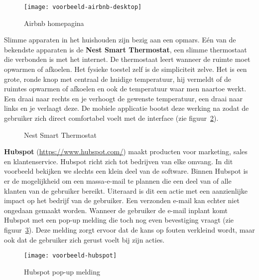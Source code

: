 \begin{figure}
    \centering
    \texttt{[image: voorbeeld-airbnb-desktop]}
    \caption[Voorbeeld Airbnb]{Airbnb homepagina}
    \label{fig:ux-voorbeeld-airbnb}
\end{figure}

Slimme apparaten in het huishouden zijn bezig aan een opmars. Eén van de bekendste apparaten is de \textbf{Nest Smart Thermostat}, een slimme thermostaat die verbonden is met het internet. De thermostaat leert wanneer de ruimte moet opwarmen of afkoelen. Het fysieke toestel zelf is de simpliciteit zelve. Het is een grote, ronde knop met centraal de huidige temperatuur, hij vermeldt of de ruimtes opwarmen of afkoelen en ook de temperatuur waar men naartoe werkt. Een draai naar rechts en je verhoogt de gewenste temperatuur, een draai naar links en je verlaagt deze. De mobiele applicatie bootst deze werking na zodat de gebruiker zich direct comfortabel voelt met de interface (zie figuur~\ref{fig:ux-voorbeeld-nest}).

\begin{figure}
    \centering
    \qquad
    \caption[Voorbeeld Nest Smart Thermostat]{Nest Smart Thermostat}
    \label{fig:ux-voorbeeld-nest}
\end{figure}

\textbf{Hubspot} (\url{https://www.hubspot.com/}) maakt producten voor marketing, sales en klantenservice. Hubspot richt zich tot bedrijven van elke omvang. In dit voorbeeld bekijken we slechts een klein deel van de software. Binnen Hubspot is er de mogelijkheid om een massa-e-mail te plannen die een deel van of alle klanten van de gebruiker bereikt. Uiteraard is dit een actie met een aanzienlijke impact op het bedrijf van de gebruiker. Een verzonden e-mail kan echter niet ongedaan gemaakt worden. Wanneer de gebruiker de e-mail inplant komt Hubspot met een pop-up melding die toch nog even bevestiging vraagt (zie figuur~\ref{fig:ux-voorbeeld-hubspot}). Deze melding zorgt ervoor dat de kans op fouten verkleind wordt, maar ook dat de gebruiker zich gerust voelt bij zijn acties.

\begin{figure}
    \centering
    \texttt{[image: voorbeeld-hubspot]}
    \caption[Voorbeeld Hubspot]{Hubspot pop-up melding}
    \label{fig:ux-voorbeeld-hubspot}
\end{figure}

